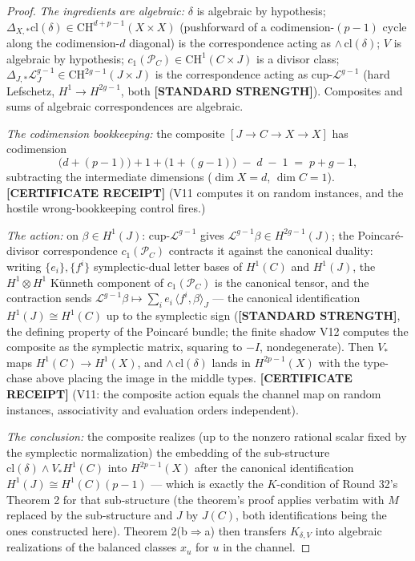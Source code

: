 \documentclass[11pt]{article}
\newcommand{\STANDARD}{\textbf{[STANDARD STRENGTH]}}
\newcommand{\CERT}{\textbf{[CERTIFICATE RECEIPT]}}
\newcommand{\CH}{\mathrm{CH}}
\begin{document}
\begin{proof}
\emph{The ingredients are algebraic:} $\delta$ is algebraic by hypothesis;
$\Delta_{X,*}\mathrm{cl}(\delta)\in\CH^{d+p-1}(X\times X)$ (pushforward of a
codimension-$(p-1)$ cycle along the codimension-$d$ diagonal) is the
correspondence acting as $\wedge\,\mathrm{cl}(\delta)$;
$V$ is algebraic by hypothesis;
$c_{1}(\mathcal P_{C})\in\CH^{1}(C\times J)$ is a divisor class;
$\Delta_{J,*}\mathcal L_{J}^{g-1}\in\CH^{2g-1}(J\times J)$ is the
correspondence acting as cup-$\mathcal L^{g-1}$ (hard Lefschetz,
$H^{1}\to H^{2g-1}$, both \STANDARD{}). Composites and sums of algebraic
correspondences are algebraic.

\emph{The codimension bookkeeping:} the composite
$[J\to C\to X\to X]$ has codimension
\[
\bigl(d+(p-1)\bigr)+1+\bigl(1+(g-1)\bigr)\;-\;d\;-\;1\;=\;p+g-1,
\]
subtracting the intermediate dimensions ($\dim X=d$, $\dim C=1$).
\CERT{} (V11 computes it on random instances, and the hostile
wrong-bookkeeping control fires.)

\emph{The action:} on $\beta\in H^{1}(J)$: cup-$\mathcal L^{g-1}$ gives
$\mathcal L^{g-1}\beta\in H^{2g-1}(J)$; the Poincaré-divisor correspondence
$c_{1}(\mathcal P_C)$ contracts it against the canonical duality: writing
$\{e_i\},\{f^{i}\}$ symplectic-dual letter bases of $H^{1}(C)$ and $H^{1}(J)$,
the $H^{1}\otimes H^{1}$ Künneth component of $c_1(\mathcal P_C)$ is the
canonical tensor, and the contraction sends
$\mathcal L^{g-1}\beta\mapsto\sum_i e_i\,\langle f^{i},\beta\rangle_{J}$ ---
the canonical identification $H^{1}(J)\cong H^{1}(C)$ up to the symplectic
sign (\STANDARD{}, the defining property of the Poincaré bundle; the finite
shadow V12 computes the composite as the symplectic matrix, squaring to
$-I$, nondegenerate). Then $V_*$ maps $H^{1}(C)\to H^{1}(X)$, and
$\wedge\,\mathrm{cl}(\delta)$ lands in $H^{2p-1}(X)$ with the type-chase
above placing the image in the middle types. \CERT{} (V11: the composite
action equals the channel map on random instances, associativity and
evaluation orders independent).

\emph{The conclusion:} the composite realizes (up to the nonzero rational
scalar fixed by the symplectic normalization) the embedding of the
sub-structure $\mathrm{cl}(\delta)\wedge V_{*}H^{1}(C)$ into
$H^{2p-1}(X)$ after the canonical identification
$H^{1}(J)\cong H^{1}(C)(p-1)$ --- which is exactly the $K$-condition of
Round 32's Theorem 2 for that sub-structure (the theorem's proof applies
verbatim with $M$ replaced by the sub-structure and $J$ by $J(C)$, both
identifications being the ones constructed here). Theorem 2(b$\Rightarrow$a)
then transfers $K_{\delta,V}$ into algebraic realizations of the balanced
classes $x_u$ for $u$ in the channel.
\end{proof}
\end{document}

